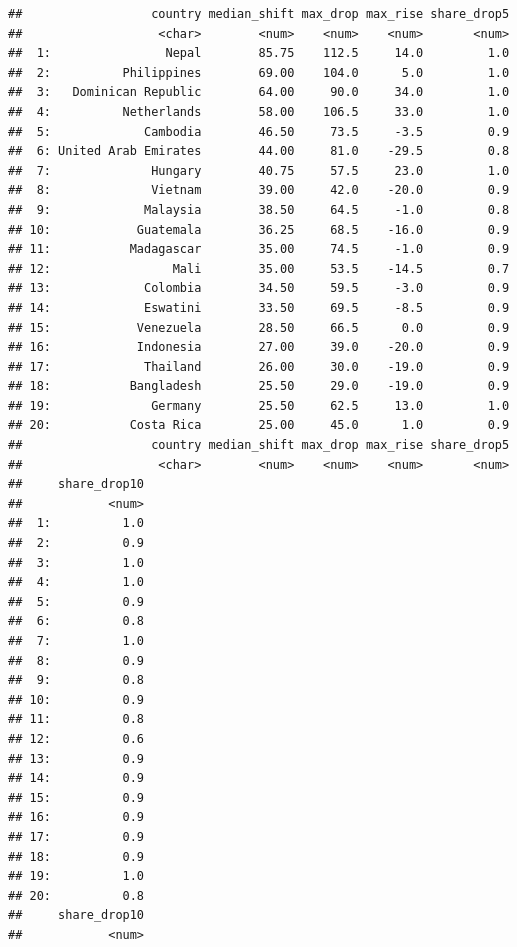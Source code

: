 \documentclass[
  11pt,
]{article}
\begin{document}
\begin{verbatim}
##                  country median_shift max_drop max_rise share_drop5
##                   <char>        <num>    <num>    <num>       <num>
##  1:                Nepal        85.75    112.5     14.0         1.0
##  2:          Philippines        69.00    104.0      5.0         1.0
##  3:   Dominican Republic        64.00     90.0     34.0         1.0
##  4:          Netherlands        58.00    106.5     33.0         1.0
##  5:             Cambodia        46.50     73.5     -3.5         0.9
##  6: United Arab Emirates        44.00     81.0    -29.5         0.8
##  7:              Hungary        40.75     57.5     23.0         1.0
##  8:              Vietnam        39.00     42.0    -20.0         0.9
##  9:             Malaysia        38.50     64.5     -1.0         0.8
## 10:            Guatemala        36.25     68.5    -16.0         0.9
## 11:           Madagascar        35.00     74.5     -1.0         0.9
## 12:                 Mali        35.00     53.5    -14.5         0.7
## 13:             Colombia        34.50     59.5     -3.0         0.9
## 14:             Eswatini        33.50     69.5     -8.5         0.9
## 15:            Venezuela        28.50     66.5      0.0         0.9
## 16:            Indonesia        27.00     39.0    -20.0         0.9
## 17:             Thailand        26.00     30.0    -19.0         0.9
## 18:           Bangladesh        25.50     29.0    -19.0         0.9
## 19:              Germany        25.50     62.5     13.0         1.0
## 20:           Costa Rica        25.00     45.0      1.0         0.9
##                  country median_shift max_drop max_rise share_drop5
##                   <char>        <num>    <num>    <num>       <num>
##     share_drop10
##            <num>
##  1:          1.0
##  2:          0.9
##  3:          1.0
##  4:          1.0
##  5:          0.9
##  6:          0.8
##  7:          1.0
##  8:          0.9
##  9:          0.8
## 10:          0.9
## 11:          0.8
## 12:          0.6
## 13:          0.9
## 14:          0.9
## 15:          0.9
## 16:          0.9
## 17:          0.9
## 18:          0.9
## 19:          1.0
## 20:          0.8
##     share_drop10
##            <num>
\end{verbatim}
\end{document}
